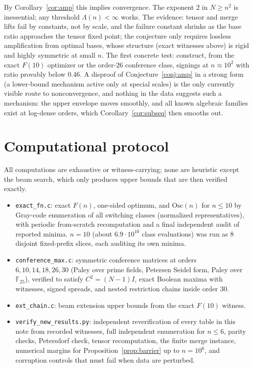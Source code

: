 \documentclass[11pt]{article}
\theoremstyle{remark}
\newcommand{\Osc}{\mathrm{Osc}}
\begin{document}
By Corollary~\ref{cor:amp} this implies convergence. The exponent
$2$ in $N\ge n^2$ is inessential; any threshold $\Lambda(n)<\infty$
works. The evidence: tensor and merge lifts fail by constants, not by
scale, and the failure constant shrinks as the base ratio approaches
the tensor fixed point; the conjecture only requires lossless
amplification from optimal bases, whose structure (exact witnesses
above) is rigid and highly symmetric at small $n$. The first concrete
test: construct, from the exact $F(10)$ optimizer or the order-$26$
conference class, signings at $n\approx10^2$ with ratio provably below
$0.46$. A disproof of Conjecture~\ref{conj:amp} in a strong form
(a lower-bound mechanism active only at special scales) is the only
currently visible route to nonconvergence, and nothing in the data
suggests such a mechanism: the upper envelope moves smoothly, and all
known algebraic families exist at log-dense orders, which
Corollary~\ref{cor:subseq} then smooths out.

\appendix

\section{Computational protocol}

All computations are exhaustive or witness-carrying; none are
heuristic except the beam search, which only produces upper bounds
that are then verified exactly.

\begin{itemize}
\item \texttt{exact\_fn.c}: exact $F(n)$, one-sided optimum, and
$\Osc(n)$ for $n\le10$ by Gray-code enumeration of all switching
classes (normalized representatives), with periodic from-scratch
recomputation and a final independent audit of reported minima.
$n=10$ (about $6.9\cdot10^{10}$ class evaluations) was run as $8$
disjoint fixed-prefix slices, each auditing its own minima.
\item \texttt{conference\_max.c}: symmetric conference matrices at
orders $6,10,14,18,26,30$ (Paley over prime fields, Petersen Seidel
form, Paley over $\mathbb F_{25}$), verified to satisfy
$C^2=(N-1)I$, exact Boolean maxima with witnesses, signed spreads,
and nested restriction chains inside order $30$.
\item \texttt{ext\_chain.c}: beam extension upper bounds from the
exact $F(10)$ witness.
\item \texttt{verify\_new\_results.py}: independent reverification of
every table in this note from recorded witnesses, full independent
enumeration for $n\le6$, parity checks, Petersdorf check, tensor
recomputation, the finite merge instance, numerical margins for
Proposition~\ref{prop:barrier} up to $n=10^6$, and corruption
controls that must fail when data are perturbed.
\end{itemize}
\end{document}
